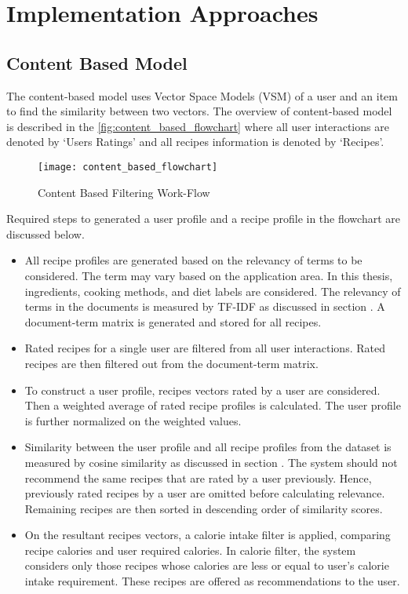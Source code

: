 \section{Implementation Approaches}
\label{sec:impl_approaches}
\subsection{Content Based Model}
\label{sec:cb}

The content-based model uses Vector Space Models (VSM) of a user and an item to find the similarity between two vectors. The overview of content-based model is described in the \autoref{fig:content_based_flowchart} where all user interactions are denoted by \lq{}Users Ratings\rq{} and all recipes information is denoted by \lq{}Recipes\rq{}.
\begin{singlespace}
\begin{figure}[H]
	\centering
	\texttt{[image: content\_based\_flowchart]}
	\caption{Content Based Filtering Work-Flow }
	\label{fig:content_based_flowchart}
\end{figure}  
\end{singlespace}

\noindent
Required steps to generated a user profile and a recipe profile in the flowchart are discussed below.
\begin{itemize}
\item All recipe profiles are generated based on the relevancy of terms to be considered. The term may vary based on the application area. In this thesis, ingredients, cooking methods, and diet labels are considered. The relevancy of terms in the documents is measured by TF-IDF as discussed in section . A document-term matrix is generated and stored for all recipes.
\item Rated recipes for a single user are filtered from all user interactions. Rated recipes are then filtered out from the document-term matrix.
\item To construct a user profile, recipes vectors rated by a user are considered. Then a weighted average of rated recipe profiles is calculated. The user profile is further normalized on the weighted values.
\item Similarity between the user profile and all recipe profiles from the dataset is measured by cosine similarity as discussed in section . The system should not recommend the same recipes that are rated by a user previously. Hence, previously rated recipes by a user are omitted before calculating relevance. Remaining recipes are then sorted in descending order of similarity scores.
\item On the resultant recipes vectors, a calorie intake filter is applied, comparing recipe calories and user required calories. In calorie filter, the system considers only those recipes whose calories are less or equal to user\rq{}s calorie intake requirement. These recipes are offered as recommendations to the user.
\end{itemize}
 
